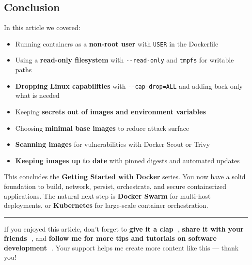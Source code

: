 \documentclass[11pt,american,a4paper,]{book}
\providecommand{\tightlist}{%
  \setlength{\itemsep}{2pt}\setlength{\parskip}{0pt}}
\begin{document}
\subsection{Conclusion}\label{conclusion}

In this article we covered:

\begin{itemize}
\tightlist
\item
  Running containers as a \textbf{non-root user} with \texttt{USER} in
  the Dockerfile
\item
  Using a \textbf{read-only filesystem} with \texttt{-\/-read-only} and
  \texttt{tmpfs} for writable paths
\item
  \textbf{Dropping Linux capabilities} with \texttt{-\/-cap-drop=ALL}
  and adding back only what is needed
\item
  Keeping \textbf{secrets out of images and environment variables}
\item
  Choosing \textbf{minimal base images} to reduce attack surface
\item
  \textbf{Scanning images} for vulnerabilities with Docker Scout or
  Trivy
\item
  \textbf{Keeping images up to date} with pinned digests and automated
  updates
\end{itemize}

This concludes the \textbf{Getting Started with Docker} series. You now
have a solid foundation to build, network, persist, orchestrate, and
secure containerized applications. The natural next step is
\textbf{Docker Swarm} for multi-host deployments, or \textbf{Kubernetes}
for large-scale container orchestration.

\begin{center}\rule{0.5\linewidth}{0.5pt}\end{center}

If you enjoyed this article, don't forget to \textbf{give it a clap 👏},
\textbf{share it with your friends 🔗}, and \textbf{follow me for more
tips and tutorials on software development 📘}. Your support helps me
create more content like this --- thank you! 🙌
\end{document}
